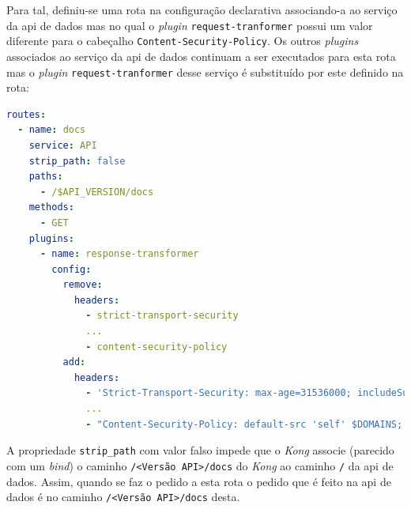 Para tal, definiu-se uma rota na configuração declarativa associando-a ao serviço da \acrshort{api} de dados mas no qual o \textit{plugin} \texttt{request-tranformer} possui um valor diferente para o cabeçalho \texttt{Content-Security-Policy}. Os outros \textit{plugins} associados ao serviço da \acrshort{api} de dados continuam a ser executados para esta rota mas o \textit{plugin} \texttt{request-tranformer} desse serviço é substituído por este definido na rota:
\begin{lstlisting}[language=yaml, caption=Configuração declarativa do \textit{Kong}: Rota da documentação]
routes:
  - name: docs
    service: API
    strip_path: false
    paths:
      - /$API_VERSION/docs
    methods:
      - GET
    plugins:
      - name: response-transformer
        config:
          remove:
            headers:
              - strict-transport-security
              ...
              - content-security-policy
          add:
            headers:
              - 'Strict-Transport-Security: max-age=31536000; includeSubDomains; preload'
              ...
              - "Content-Security-Policy: default-src 'self' $DOMAINS; img-src 'self' https://validator.swagger.io data: $DOMAINS; style-src 'self' 'unsafe-inline' $DOMAINS; script-src 'self' 'unsafe-inline' $DOMAINS"
\end{lstlisting}
A propriedade \texttt{strip\_path} com valor falso impede que o \textit{Kong} associe (parecido com um \textit{bind}) o caminho \texttt{/<Versão API>/docs} do \textit{Kong} ao caminho \texttt{/} da \acrshort{api} de dados. Assim, quando se faz o pedido a esta rota o pedido que é feito na \acrshort{api} de dados é no caminho \texttt{/<Versão API>/docs} desta. 

